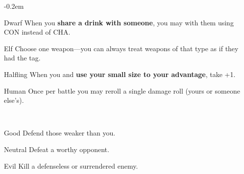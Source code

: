 \documentclass[8pt]{extarticle}
\begin{document}
\openup -0.2em

\charbanner

\begin{minipage}[t]{3.2in}

\begin{optfeature}{Dwarf}
  When you \textbf{share a drink with someone}, you may 
  with them using CON instead of CHA.
\end{optfeature}

\begin{optfeature}{Elf}
  Choose one weapon—you can always treat weapons of that type as if
  they had the  tag.
\end{optfeature}

\begin{optfeature}{Halfling}
  When you  and \textbf{use your small size to your
    advantage}, take +1.
\end{optfeature}

\begin{optfeature}{Human}
  Once per battle you may reroll a single damage roll (yours or
  someone else’s).
\end{optfeature}

\ 


\begin{optfeature}{Good}
  Defend those weaker than you.
\end{optfeature}

\begin{optfeature}{Neutral}
  Defeat a worthy opponent.
\end{optfeature}

\begin{optfeature}{Evil}
  Kill a defenseless or surrendered enemy.
\end{optfeature}


\ 


\vfill\null
\end{minipage}
\end{document}
